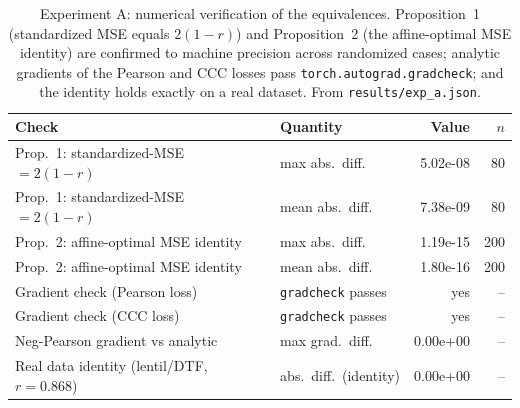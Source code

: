 \begin{table}[ht]
\caption{Experiment A: numerical verification of the equivalences. Proposition~1 (standardized MSE equals $2(1-r)$) and Proposition~2 (the affine-optimal MSE identity) are confirmed to machine precision across randomized cases; analytic gradients of the Pearson and CCC losses pass \texttt{torch.autograd.gradcheck}; and the identity holds exactly on a real dataset. From \texttt{results/exp\_a.json}.}
\label{tab:S-expA}
\begin{tabular}{llrr}
\toprule
Check & Quantity & Value & $n$ \\
\midrule
Prop.\ 1: standardized-MSE $=2(1-r)$ & max abs.\ diff. & 5.02e-08 & 80 \\
Prop.\ 1: standardized-MSE $=2(1-r)$ & mean abs.\ diff. & 7.38e-09 & 80 \\
Prop.\ 2: affine-optimal MSE identity & max abs.\ diff. & 1.19e-15 & 200 \\
Prop.\ 2: affine-optimal MSE identity & mean abs.\ diff. & 1.80e-16 & 200 \\
Gradient check (Pearson loss) & \texttt{gradcheck} passes & yes & -- \\
Gradient check (CCC loss) & \texttt{gradcheck} passes & yes & -- \\
Neg-Pearson gradient vs analytic & max grad.\ diff. & 0.00e+00 & -- \\
Real data identity (lentil/DTF, $r=0.868$) & abs.\ diff.\ (identity) & 0.00e+00 & -- \\
\bottomrule
\end{tabular}
\end{table}
